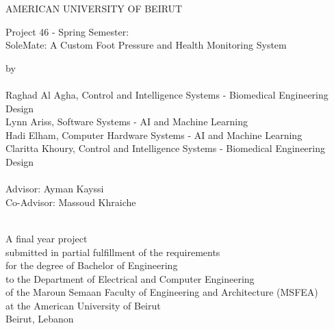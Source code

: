 \begin{titlepage}
\begin{center}

\LARGE{AMERICAN UNIVERSITY OF BEIRUT\\}
\vspace{3cm}

\LARGE{Project 46 - Spring Semester:\\
       SoleMate: A Custom Foot Pressure and Health Monitoring System\\} 
\vspace{1cm}

\normalsize{by\\ ~\\} 
\Large{ Raghad Al Agha, Control and Intelligence Systems - Biomedical Engineering Design \\
        Lynn Ariss, Software Systems - AI and Machine Learning \\
        Hadi Elham, Computer Hardware Systems  - AI and Machine Learning \\
        Claritta Khoury, Control and Intelligence Systems - Biomedical Engineering Design \\
        ~\\
        Advisor: Ayman Kayssi\\
         Co-Advisor: Massoud Khraiche\\ 
         ~\\
    }  
\vspace{1cm}

\normalsize{A final year project\\}
\normalsize{submitted in partial fulfillment of the requirements\\}
\normalsize{for the degree of Bachelor of Engineering\\}
\small{to the Department of Electrical and Computer Engineering\\}
\normalsize{of the Maroun Semaan Faculty of Engineering and Architecture (MSFEA)\\}
\normalsize{at the American University of Beirut\\} 
\normalsize{Beirut, Lebanon\\
} 
\end{center}
\end{titlepage}
